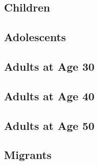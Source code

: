 \documentclass[12pt]{article}
\begin{document}
\subsection{Children}




\subsection{Adolescents}




\subsection{Adults at Age 30}




\subsection{Adults at Age 40}




\subsection{Adults at Age 50}




\subsection{Migrants}



\end{document}
